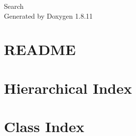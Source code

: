 \documentclass[twoside]{book}
\newcommand{\+}{\discretionary{\mbox{\scriptsize$\hookleftarrow$}}{}{}}
\newcommand{\clearemptydoublepage}{%
  \newpage{\pagestyle{empty}\cleardoublepage}%
}
\begin{document}
\hypersetup{pageanchor=false,
             bookmarksnumbered=true,
             pdfencoding=unicode
            }
\begin{titlepage}
\vspace*{7cm}
\begin{center}%
{\Large Search }\\
\vspace*{1cm}
{\large Generated by Doxygen 1.8.11}\\
\end{center}
\end{titlepage}
\clearemptydoublepage
\tableofcontents
\clearemptydoublepage
{}
\hypersetup{pageanchor=true}

\chapter{R\+E\+A\+D\+ME}
\label{md_README}
\hypertarget{md_README}{}

\chapter{Hierarchical Index}

\chapter{Class Index}

\end{document}
